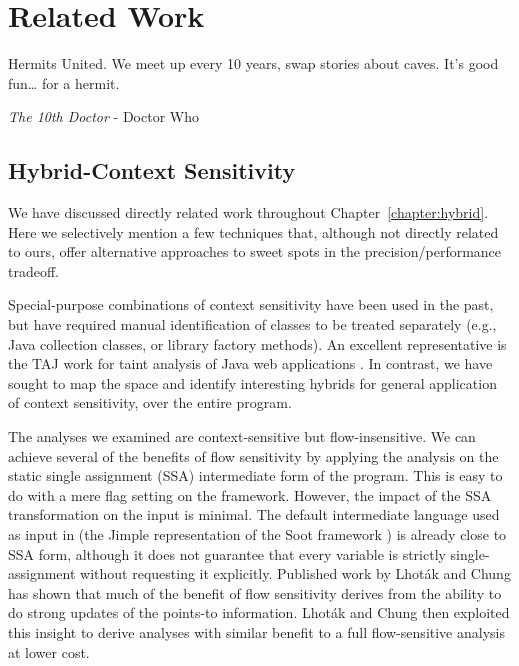 \chapter{Related Work}
\label{chapter:related}
\epigraph{Hermits United. We meet up every 10 years, swap stories about caves. It’s good fun… for a hermit.}{\textit{The 10th Doctor} - Doctor Who}


\section{Hybrid-Context Sensitivity}

We have discussed directly related work throughout Chapter~\ref{chapter:hybrid}. Here we selectively mention a few techniques that, although not directly related to ours, offer alternative approaches to sweet spots in the precision/performance tradeoff.

Special-purpose combinations of context sensitivity have been used in the past, but have required manual identification of classes to be treated separately (e.g., Java collection classes, or library factory methods). An excellent representative is the TAJ work for taint analysis of Java web applications \cite{pldi:2009:Tripp}. In contrast, we have sought to map the space and identify interesting hybrids for general application of context sensitivity, over the entire program.

The analyses we examined are context-sensitive but flow-insensitive. We can achieve several of the benefits of flow sensitivity by applying the analysis on the static single assignment (SSA) intermediate form of the program. This is easy to do with a mere flag setting on the \doop{} framework. However, the impact of the SSA transformation on the input is minimal. The default intermediate language used as input in \doop{} (the Jimple representation of the Soot framework \cite{cascon:1999:Vall,cc:2000:Vall}) is already close to SSA form, although it does not guarantee that every variable is strictly single-assignment without requesting it explicitly. Published work by Lhot\'{a}k and Chung \cite{popl:2011:Lhotak} has shown that much of the benefit of flow sensitivity derives from the ability to do strong updates of the points-to information. Lhot\'{a}k and Chung then exploited this insight to derive analyses with similar benefit to a full flow-sensitive analysis at lower cost.

